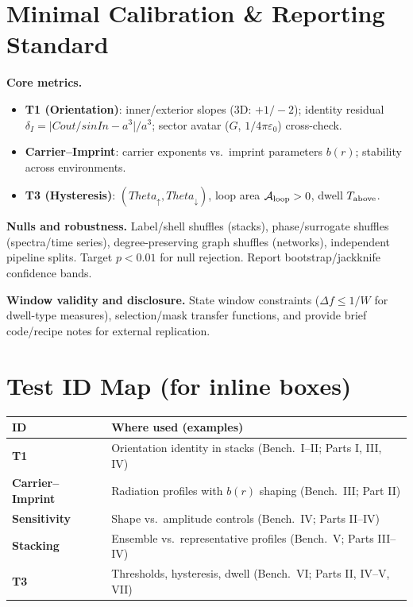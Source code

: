 \documentclass[12pt,a4paper,oneside]{scrreprt}
\def\Cout{Cout}%
\def\sinIn{sinIn}%
\def\Theta{Theta}%
\newcommand{\sinIn}{s_{\mathrm{in}}}
\newcommand{\Cout}{C_{\mathrm{out}}}
\begin{document}
\chapter*{Minimal Calibration \& Reporting Standard}
\noindent\textbf{Core metrics.}
\begin{itemize}\setlength\itemsep{0.2em}
\item \textbf{T1 (Orientation)}: inner/exterior slopes (3D: $+1/-2$); identity residual $\delta_I=\big|\Cout/\sinIn-a^3\big|/a^3$; sector avatar ($G$, $1/4\pi\varepsilon_0$) cross-check.
\item \textbf{Carrier–Imprint}: carrier exponents vs.\ imprint parameters $b(r)$; stability across environments.
\item \textbf{T3 (Hysteresis)}: $(\Theta_\uparrow,\Theta_\downarrow)$, loop area $\mathcal A_{\rm loop}>0$, dwell $T_{\rm above}$.
\end{itemize}

\noindent\textbf{Nulls and robustness.}
Label/shell shuffles (stacks), phase/surrogate shuffles (spectra/time series), degree-preserving graph shuffles (networks), independent pipeline splits. Target $p<0.01$ for null rejection. Report bootstrap/jackknife confidence bands.

\noindent\textbf{Window validity and disclosure.}
State window constraints ($\Delta f\le1/W$ for dwell-type measures), selection/mask transfer functions, and provide brief code/recipe notes for external replication.

\chapter*{Test ID Map (for inline boxes)}
\begin{tabular}{@{}ll@{}}
\toprule
ID & Where used (examples) \\
\midrule
\textbf{T1} & Orientation identity in stacks (Bench.~I–II; Parts I, III, IV) \\
\textbf{Carrier–Imprint} & Radiation profiles with $b(r)$ shaping (Bench.~III; Part II) \\
\textbf{Sensitivity} & Shape vs.\ amplitude controls (Bench.~IV; Parts II–IV) \\
\textbf{Stacking} & Ensemble vs.\ representative profiles (Bench.~V; Parts III–IV) \\
\textbf{T3} & Thresholds, hysteresis, dwell (Bench.~VI; Parts II, IV–V, VII) \\
\bottomrule
\end{tabular}
\end{document}
